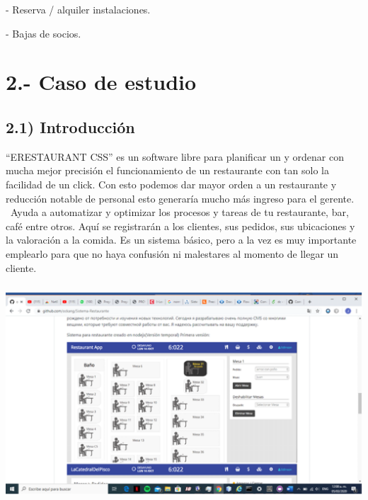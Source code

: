 \documentclass{article} %
\begin{document}
\noindent - Reserva / alquiler instalaciones.

\noindent  - Bajas de socios.

\noindent \textbf{}

\noindent \textbf{}

\noindent \textbf{}

\noindent \textbf{}

\noindent \textbf{}

\noindent \textbf{}

\noindent \textbf{}


\section{}


\section{2.- Caso de estudio}


\subsection{     2.1) Introducci\'{o}n }

\noindent      ``ERESTAURANT CSS'' es un software libre para planificar un y ordenar con mucha mejor precisi\'{o}n el funcionamiento de un restaurante con tan solo la facilidad de un click. Con esto podemos dar mayor orden a un restaurante y reducci\'{o}n notable de personal esto generar\'{i}a mucho m\'{a}s ingreso para el gerente. ~Ayuda a automatizar y optimizar los procesos y tareas de tu restaurante, bar, caf\'{e} entre otros. Aqu\'{i} se registrar\'{a}n a los clientes, sus pedidos, sus ubicaciones y la valoraci\'{o}n a la comida. Es un sistema b\'{a}sico, pero a la vez es muy importante emplearlo para que no haya confusi\'{o}n ni malestares al momento de llegar un cliente.

\noindent \includegraphics*[width=5.54in, height=3.20in, keepaspectratio=false, trim=1.44in 0.41in 1.55in 1.19in]{image4} 
\end{document}

